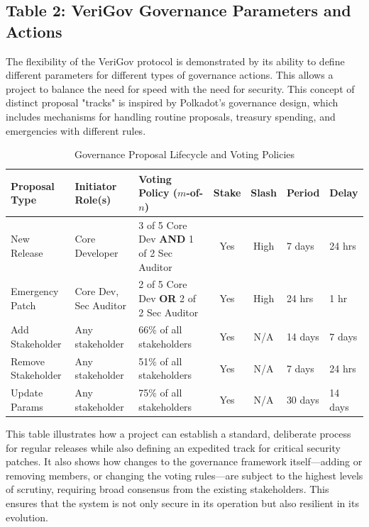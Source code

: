 \documentclass{article}
\begin{document}
\subsection{Table 2: VeriGov Governance Parameters and Actions}

The flexibility of the VeriGov protocol is demonstrated by its ability to define different parameters for different types of governance actions. This allows a project to balance the need for speed with the need for security. This concept of distinct proposal "tracks" is inspired by Polkadot's governance design, which includes mechanisms for handling routine proposals, treasury spending, and emergencies with different rules.~\cite{polkadot-opengov}

\begin{table}[H]
    \centering
    \caption{Governance Proposal Lifecycle and Voting Policies}
    \label{tab:governance_policies}
    \footnotesize %
    \setlength{\tabcolsep}{3pt} %
    \begin{tabularx}{\textwidth}{l L L c c l l}
        \toprule
        \textbf{Proposal Type} & \textbf{Initiator Role(s)} & \textbf{Voting Policy ($m$-of-$n$)} & \textbf{Stake} & \textbf{Slash} & \textbf{Period} & \textbf{Delay} \\
        \midrule
        New Release & Core Developer & 3 of 5 Core Dev \textbf{AND} 1 of 2 Sec Auditor & Yes & High & 7 days & 24 hrs \\
        \addlinespace
        Emergency Patch & Core Dev, Sec Auditor & 2 of 5 Core Dev \textbf{OR} 2 of 2 Sec Auditor & Yes & High & 24 hrs & 1 hr \\
        \addlinespace
        Add Stakeholder & Any stakeholder & 66\% of all stakeholders & Yes & N/A & 14 days & 7 days \\
        \addlinespace
        Remove Stakeholder & Any stakeholder & 51\% of all stakeholders & Yes & N/A & 7 days & 24 hrs \\
        \addlinespace
        Update Params & Any stakeholder & 75\% of all stakeholders & Yes & N/A & 30 days & 14 days \\
        \bottomrule
    \end{tabularx}
\end{table}

This table illustrates how a project can establish a standard, deliberate process for regular releases while also defining an expedited track for critical security patches. It also shows how changes to the governance framework itself---adding or removing members, or changing the voting rules---are subject to the highest levels of scrutiny, requiring broad consensus from the existing stakeholders. This ensures that the system is not only secure in its operation but also resilient in its evolution.
\end{document}
